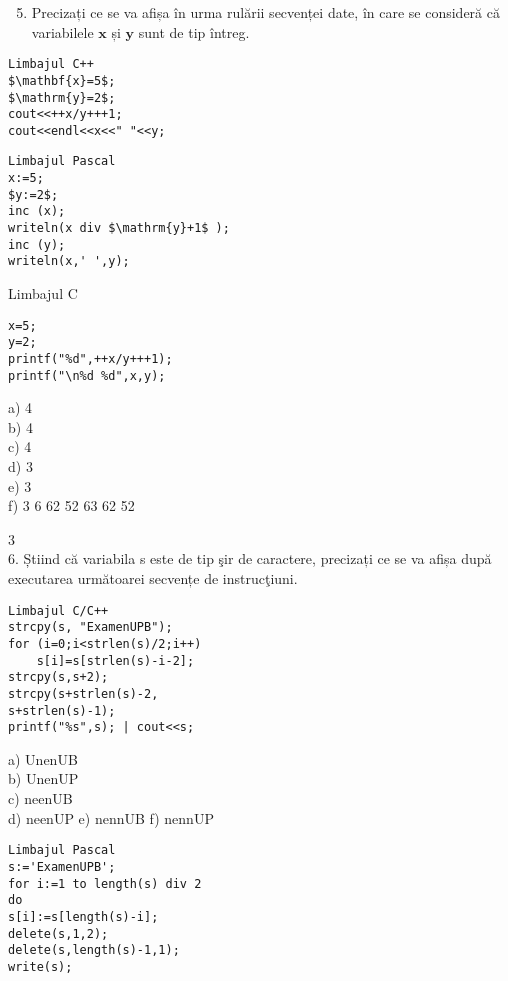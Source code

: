 \begin{enumerate}
  \setcounter{enumi}{4}
  \item Precizați ce se va afișa în urma rulării secvenței date, în care se consideră că variabilele $\mathbf{x}$ și $\mathbf{y}$ sunt de tip întreg.
\end{enumerate}

\begin{verbatim}
Limbajul C++
$\mathbf{x}=5$;
$\mathrm{y}=2$;
cout<<++x/y+++1;
cout<<endl<<x<<" "<<y;
\end{verbatim}

\begin{verbatim}
Limbajul Pascal
x:=5;
$y:=2$;
inc (x);
writeln(x div $\mathrm{y}+1$ );
inc (y);
writeln(x,' ',y);
\end{verbatim}

Limbajul C

\begin{verbatim}
x=5;
y=2;
printf("%d",++x/y+++1);
printf("\n%d %d",x,y);
\end{verbatim}

a) 4\\
b) 4\\
c) 4\\
d) 3\\
e) 3\\
f) 3 6 62 52 63 62 52

3\\
6. Ș̦tiind că variabila s este de tip şir de caractere, precizați ce se va afișa după executarea următoarei secvențe de instrucţiuni.

\begin{verbatim}
Limbajul C/C++
strcpy(s, "ExamenUPB");
for (i=0;i<strlen(s)/2;i++)
    s[i]=s[strlen(s)-i-2];
strcpy(s,s+2);
strcpy(s+strlen(s)-2,
s+strlen(s)-1);
printf("%s",s); | cout<<s;
\end{verbatim}

a) UnenUB\\
b) UnenUP\\
c) neenUB\\
d) neenUP e) nennUB f) nennUP

\begin{verbatim}
Limbajul Pascal
s:='ExamenUPB';
for i:=1 to length(s) div 2
do
s[i]:=s[length(s)-i];
delete(s,1,2);
delete(s,length(s)-1,1);
write(s);
\end{verbatim}

